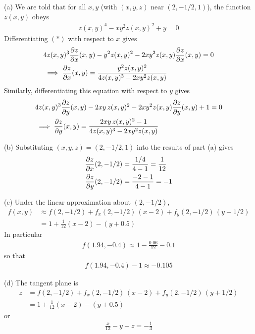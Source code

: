 \begin{solution}
(a) 
We are told that for all $x,y$ (with $(x,y,z)$ near $(2,-1/2,1)$),
the function $z(x,y)$ obeys
\begin{align*}
z(x,y)^4 -xy^2 z(x,y)^2 +y=0
\tag{$*$}\end{align*}
Differentiating $(*)$ with respect to $x$ gives
\begin{align*}
&4z(x,y)^3\pdiff{z}{x}(x,y) - y^2z(x,y)^2 -2xy^2z(x,y)\pdiff{z}{x}(x,y) =0 \\
&\implies 
\pdiff{z}{x}(x,y) = \frac{y^2 z(x,y)^2}{4z(x,y)^3-2xy^2z(x,y)}
\end{align*}
Similarly, differentiating this equation with respect to $y$ gives
\begin{align*}
&4z(x,y)^3\pdiff{z}{y}(x,y) - 2xy\,z(x,y)^2 -2xy^2z(x,y)\pdiff{z}{y}(x,y) +1=0 \\
&\implies 
\pdiff{z}{y}(x,y) = \frac{2xy\, z(x,y)^2-1}{4z(x,y)^3-2xy^2z(x,y)}
\end{align*}

(b) Substituting $(x, y, z) = (2, -1/2, 1)$ into the results of part (a)
gives
\begin{align*}
\pdiff{z}{x}(2,-1/2) &= \frac{1/4}{4-1} =\frac{1}{12}\\
\pdiff{z}{y}(2,-1/2) &= \frac{-2-1}{4-1}=-1
\end{align*}

(c) Under the linear approximation about $(2,-1/2)$,
\begin{align*}
f(x,y) &\approx f(2,-1/2) + f_x(2,-1/2)\,(x-2) + f_y(2,-1/2)\,(y+1/2) \\
       &= 1 +\frac{1}{12}(x-2) - (y+0.5)
\end{align*}
In particular
\begin{align*}
f(1.94,-0.4) \approx 1 -\frac{0.06}{12}-0.1 
\end{align*}
so that
\begin{align*}
f(1.94,-0.4) - 1  \approx -0.105
\end{align*}

(d) The tangent plane is
\begin{align*}
z&=f(2,-1/2) + f_x(2,-1/2)\,(x-2) + f_y(2,-1/2)\,(y+1/2) \\
 &= 1 +\frac{1}{12}(x-2) - (y+0.5)
\end{align*}
or
\begin{align*}
\frac{x}{12} -y -z = -\frac{1}{3}
\end{align*}
\end{solution}

